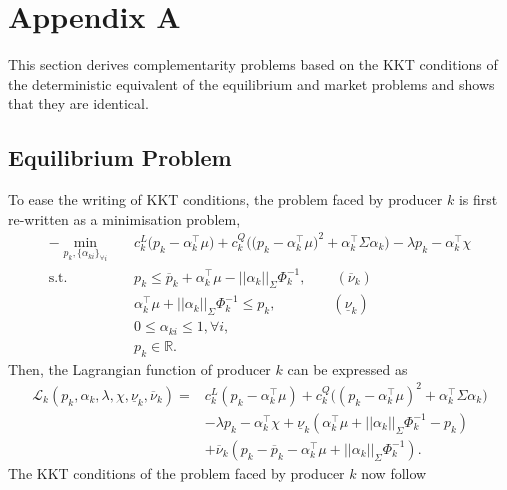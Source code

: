 \documentclass{article}
\begin{document}
\section*{Appendix A}
This section derives complementarity problems based on the KKT conditions of the deterministic equivalent of the equilibrium and market problems and shows that they are identical.

\subsection*{Equilibrium Problem}
To ease the writing of KKT conditions, the problem faced by producer $k$ is first re-written as a minimisation problem,
\begin{align}
-\underset{p_k, \{\alpha_{ki}\}_{\forall i}}{\min} \hspace{10pt} &  c_k^L\big(p_k - \alpha_k^\top \mu\big) + c_k^Q \Big(\big(p_k - \alpha_{k}^\top \mu \big)^2 + \alpha_k^\top \Sigma \alpha_k\Big) - \lambda p_k - \alpha_k^\top \chi\\
\mbox{s.t. } & p_k \le \overline{p}_k + \alpha_k^\top \mu - ||\alpha_k||_{\Sigma} \Phi_k^{-1}, \hspace{25pt} (\overline{\nu}_k)\\
& \alpha_k^\top \mu + ||\alpha_k||_{\Sigma}\Phi_k^{-1} \le p_k, \hspace{48pt}(\underline{\nu}_k)\\
& 0 \le \alpha_{ki} \le 1, \forall i,\\
& p_k \in \mathbb{R}.
\end{align}
Then, the Lagrangian function of producer $k$ can be expressed as
\begin{align*}
\mathcal{L}_k(p_k, \alpha_k, \lambda, \chi, \underline{\nu}_k, \overline{\nu}_k) =& c_k^L(p_k - \alpha_k^\top \mu) + c_k^Q \big((p_k - \alpha_k^\top \mu)^2 + \alpha_k^\top \Sigma \alpha_k\big)\\
&- \lambda p_k - \alpha_k^\top \chi + \underline{\nu}_k(\alpha_k^\top \mu + ||\alpha_k||_{\Sigma} \Phi_k^{-1} - p_k)\\
&+ \overline{\nu}_k (p_k - \overline{p}_k - \alpha_k^\top \mu + ||\alpha_k||_{\Sigma} \Phi_k^{-1}).
\end{align*}
The KKT conditions of the problem faced by producer $k$ now follow
\end{document}
